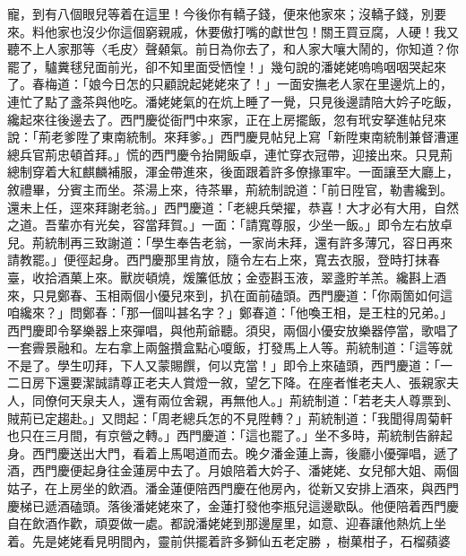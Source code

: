 寵，到有八個眼兒等着在這里！今後你有轎子錢，便來他家來；沒轎子錢，別要來。料他家也沒少你這個窮親戚，休要傲打嘴的獻世包！關王買豆腐，人硬！我又聽不上人家那等〈毛皮〉聲顙氣。前日為你去了，和人家大嚷大鬧的，你知道？你罷了，驢糞毬兒面前光，卻不知里面受恓惶！」幾句說的潘姥姥嗚嗚咽咽哭起來了。春梅道：「娘今日怎的只顧說起姥姥來了！」一面安撫老人家在里邊炕上的，連忙了點了盞茶與他吃。潘姥姥氣的在炕上睡了一覺，只見後邊請陪大妗子吃飯，纔起來往後邊去了。西門慶從衙門中來家，正在上房擺飯，忽有玳安拏進帖兒來說：「荊老爹陞了東南統制。來拜爹。」西門慶見帖兒上寫「新陞東南統制兼督漕運總兵官荊忠頓首拜。」慌的西門慶令抬開飯卓，連忙穿衣冠帶，迎接出來。只見荊總制穿着大紅麒麟補服，渾金帶進來，後面跟着許多僚掾軍牢。一面讓至大廳上，敘禮畢，分賓主而坐。茶湯上來，待茶畢，荊統制說道：「前日陞官，勒書纔到。還未上任，逕來拜謝老翁。」西門慶道：「老總兵榮擢，恭喜！大才必有大用，自然之道。吾輩亦有光矣，容當拜賀。」一面：「請寬尊服，少坐一飯。」即令左右放卓兒。荊統制再三致謝道：「學生奉告老翁，一家尚未拜，還有許多薄冗，容日再來請教罷。」便徑起身。西門慶那里肯放，隨令左右上來，寬去衣服，登時打抹春臺，收拾酒菓上來。獸炭頓燒，煖簾低放；金壺斟玉液，翠盞貯羊羔。纔斟上酒來，只見鄭春、玉相兩個小優兒來到，扒在面前磕頭。西門慶道：「你兩箇如何這咱纔來？」問鄭春：「那一個叫甚名字？」鄭春道：「他喚王相，是王柱的兄弟。」西門慶即令拏樂器上來彈唱，與他荊爺聽。須臾，兩個小優安放樂器停當，歌唱了一套霽景融和。左右拿上兩盤攢盒點心嗄飯，打發馬上人等。荊統制道：「這等就不是了。學生叨拜，下人又蒙賜饌，何以克當！」即令上來磕頭，西門慶道：「一二日房下還要潔誠請尊正老夫人賞燈一敘，望乞下降。在座者惟老夫人、張親家夫人，同僚何天泉夫人，還有兩位舍親，再無他人。」荊統制道：「若老夫人尊票到、賊荊已定趨赴。」又問起：「周老總兵怎的不見陞轉？」荊統制道：「我聞得周菊軒也只在三月間，有京營之轉。」西門慶道：「這也罷了。」坐不多時，荊統制告辭起身。西門慶送出大門，看着上馬喝道而去。晚夕潘金蓮上壽，後廳小優彈唱，遞了酒，西門慶便起身往金蓮房中去了。月娘陪着大妗子、潘姥姥、女兒郁大姐、兩個姑子，在上房坐的飲酒。潘金蓮便陪西門慶在他房內，從新又安排上酒來，與西門慶梯已遞酒磕頭。落後潘姥姥來了，金蓮打發他李瓶兒這邊歇臥。他便陪着西門慶自在飲酒作歡，頑耍做一處。都說潘姥姥到那邊屋里，如意、迎春讓他熱炕上坐着。先是姥姥看見明間內，靈前供擺着許多獅仙五老定勝 ，樹菓柑子，石榴蘋婆 
